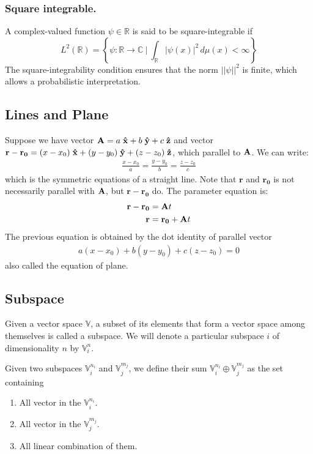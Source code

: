 \documentclass[../../../main.tex]{subfiles}
\begin{document}
\subsubsection{Square integrable.}
A complex-valued function $\psi \in \mathbb{R}$ is said to be square-integrable if
\begin{equation*}
	L^2(\mathbb{R}) = \left\{ \psi : \mathbb{R} \to \mathbb{C} \ \Big| \ \int_\mathbb{R} |\psi(x)|^2 \, d\mu(x) < \infty \right\}
\end{equation*}
The square-integrability condition ensures that the norm $||\psi||^2$ is finite, which allows a probabilistic interpretation.

\subsection{Lines and Plane}
Suppose we have vector $\mathbf{A}=a\;\mathbf{\hat{x}}+b\;\mathbf{\hat{y}} +c\;\mathbf{\hat{z}}$ and vector $\mathbf{r}-\mathbf{r_0}=(x-x_0)\;\mathbf{\hat{x}}+(y-y_0)\;\mathbf{\hat{y}} +(z-z_0)\;\mathbf{\hat{z}}$, which parallel to $\mathbf{A}$.
We can write:
\begin{align*}
	\frac{x-x_0}{a}=\frac{y-y_0}{b}=\frac{z-z_0}{c}
\end{align*}
which is the symmetric equations of a straight line.
Note that $\mathbf{r}$ and $\mathbf{r_0}$ is not necessarily parallel with $\mathbf{A}$, but $\mathbf{r}-\mathbf{r_0}$ do.
The parameter equation is:
\begin{align*}
	\mathbf{r}-\mathbf{r_0} & =\mathbf{A} t              \\
	\mathbf{r}              & =\mathbf{r_0}+\mathbf{A} t
\end{align*}
The previous equation is obtained by the dot identity of parallel vector
\begin{align*}
	a(x-x_0)+b(y-y_0)+c(z-z_0)=0
\end{align*}
also called the equation of plane.

\subsection{Subspace}
Given a vector space $\mathbb{V}$, a subset of its elements that form a vector space among themselves is called a subspace.
We will denote a particular subspace $i$ of dimensionality $n$ by $\mathbb{V}_i^n$.

Given two subspaces $\mathbb{V}_i^{n_i}$ and $\mathbb{V}_j^{m_j}$, we define their sum $\mathbb{V}_i^{n_i}\oplus\mathbb{V}_j^{m_j}$ as the set containing
\begin{enumerate}
	\item All vector in the $\mathbb{V}_i^{n_i}$.
	\item All vector in the $\mathbb{V}_j^{m_j}$.
	\item All linear combination of them.
\end{enumerate}
\end{document}
